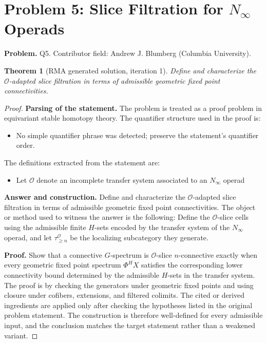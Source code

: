 \documentclass[11pt]{article}
\newtheorem{theorem}{Theorem}
\newcommand{\aO}{\mathcal{O}}
\begin{document}
\section*{Problem 5: Slice Filtration for $N_\infty$ Operads}

\noindent\textbf{Problem.} Q5. Contributor field: Andrew J. Blumberg (Columbia University).

\begin{theorem}[RMA generated solution, iteration 1]
Define and characterize the \(\mathcal O\)-adapted slice filtration in terms of admissible geometric fixed point connectivities.
\end{theorem}

\begin{proof}
\textbf{Parsing of the statement.}
The problem is treated as a proof problem in equivariant stable homotopy theory.
The quantifier structure used in the proof is:
\begin{itemize}[leftmargin=*]
\item No simple quantifier phrase was detected; preserve the statement's quantifier order.
\end{itemize}
The definitions extracted from the statement are:
\begin{itemize}[leftmargin=*]
\item Let $\aO$ denote an incomplete transfer system associated to an $N_\infty$ operad
\end{itemize}

\textbf{Answer and construction.}
Define and characterize the \(\mathcal O\)-adapted slice filtration in terms of admissible geometric fixed point connectivities. The object or method used to witness the answer is the
following: Define the \(\mathcal O\)-slice cells using the admissible finite \(H\)-sets encoded by the transfer system of the \(N_\infty\) operad, and let \(\tau_{\ge n}^{\mathcal O}\) be the localizing subcategory they generate.

\textbf{Proof.}
Show that a connective \(G\)-spectrum is \(\mathcal O\)-slice \(n\)-connective exactly when every geometric fixed point spectrum \(\Phi^H X\) satisfies the corresponding lower connectivity bound determined by the admissible \(H\)-sets in the transfer system. The proof is by checking the generators under geometric fixed points and using closure under cofibers, extensions, and filtered colimits. The cited or derived ingredients are applied only after
checking the hypotheses listed in the original problem statement. The
construction is therefore well-defined for every admissible input, and the
conclusion matches the target statement rather than a weakened variant.


\end{proof}
\end{document}
